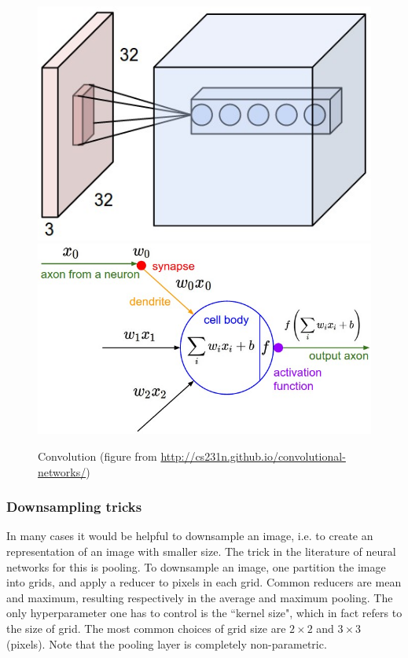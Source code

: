 \documentclass{article}
\begin{document}
\begin{figure}
\includegraphics[scale=0.2]{depthcol}
\includegraphics[scale=0.2]{neuron_model}
\caption{Convolution (figure from \url{http://cs231n.github.io/convolutional-networks/})}
\label{conv}
\end{figure}

\subsubsection{Downsampling tricks}

In many cases it would be helpful to downsample an image, i.e. to create an representation of an image with smaller size.
The trick in the literature of neural networks for this is pooling.
To downsample an image, one partition the image into grids, and apply a reducer to pixels in each grid.
Common reducers are mean and maximum, resulting respectively in the average and maximum pooling.
The only hyperparameter one has to control is the ``kernel size", which in fact refers to the size of grid.
The most common choices of grid size are $2 \times 2$ and $3 \times 3$ (pixels).
Note that the pooling layer is completely non-parametric.
\end{document}
